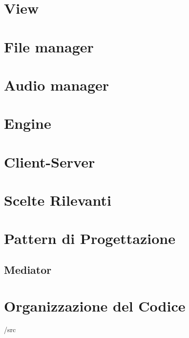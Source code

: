  \section{View}
 \section{File manager}
 \section{Audio manager}
 \section{Engine}
 \section{Client-Server}
\section{Scelte Rilevanti}
\section{Pattern di Progettazione%
}
\subsection{Mediator}
\section{Organizzazione del Codice}
/src